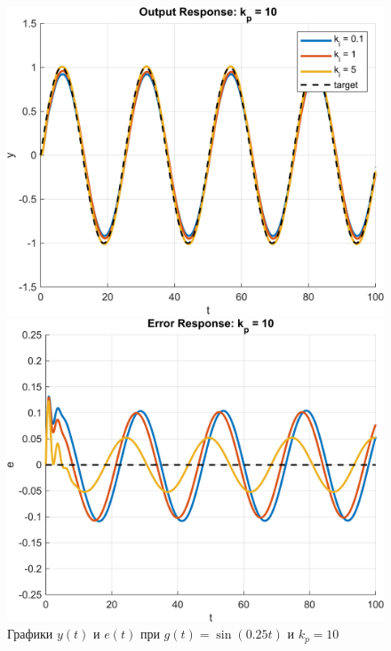 \begin{figure}[H]
    \centering
    \begin{minipage}{0.45\textwidth}
        \centering
        \includegraphics[width=1\textwidth, trim={1cm 0cm 1cm 0cm}]{../images/input_4_kp_10_output.png}
    \end{minipage}
    \hfill
    \begin{minipage}{0.45\textwidth}
        \centering
        \includegraphics[width=1\textwidth, trim={1cm 0cm 1cm 0cm}]{../images/input_4_kp_10_error.png}
    \end{minipage}
    \caption{Графики $y(t)$ и $e(t)$ при $g(t) = \sin(0.25t)$ и $k_p = 10$}
\end{figure}
